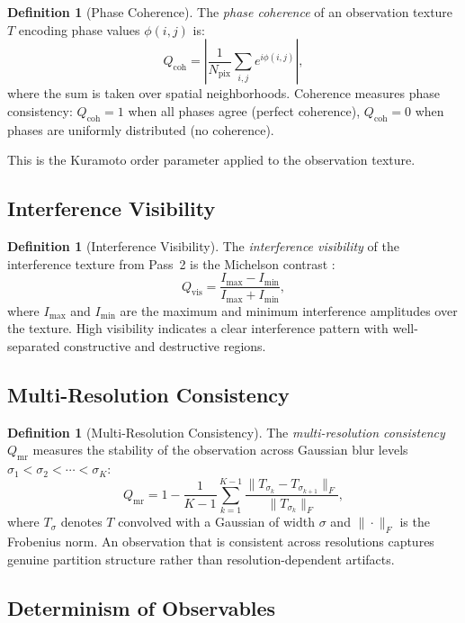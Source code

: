 \documentclass[11pt,twocolumn,a4paper]{article}
\theoremstyle{definition}
\newtheorem{definition}[theorem]{Definition}
\theoremstyle{remark}
\newcommand{\Qcoh}{Q_{\mathrm{coh}}}
\newcommand{\Qvis}{Q_{\mathrm{vis}}}
\newcommand{\Qmr}{Q_{\mathrm{mr}}}
\newcommand{\Npix}{N_{\mathrm{pix}}}
\begin{document}
\begin{definition}[Phase Coherence]
\label{def:coherence}
The \emph{phase coherence} of an observation texture $T$ encoding phase values $\phi(i,j)$ is:
\[
\Qcoh = \left| \frac{1}{\Npix} \sum_{i,j} e^{i\phi(i,j)} \right|,
\]
where the sum is taken over spatial neighborhoods. Coherence measures phase consistency: $\Qcoh = 1$ when all phases agree (perfect coherence), $\Qcoh = 0$ when phases are uniformly distributed (no coherence).
\end{definition}

This is the Kuramoto order parameter \citep{kuramoto1975, kuramoto1984} applied to the observation texture.

\subsection{Interference Visibility}

\begin{definition}[Interference Visibility]
\label{def:visibility}
The \emph{interference visibility} of the interference texture from Pass~2 is the Michelson contrast \citep{michelson1927}:
\[
\Qvis = \frac{I_{\max} - I_{\min}}{I_{\max} + I_{\min}},
\]
where $I_{\max}$ and $I_{\min}$ are the maximum and minimum interference amplitudes over the texture. High visibility indicates a clear interference pattern with well-separated constructive and destructive regions.
\end{definition}

\subsection{Multi-Resolution Consistency}

\begin{definition}[Multi-Resolution Consistency]
\label{def:multiresolution}
The \emph{multi-resolution consistency} $\Qmr$ measures the stability of the observation across Gaussian blur levels $\sigma_1 < \sigma_2 < \cdots < \sigma_K$:
\[
\Qmr = 1 - \frac{1}{K-1} \sum_{k=1}^{K-1} \frac{\|T_{\sigma_k} - T_{\sigma_{k+1}}\|_F}{\|T_{\sigma_k}\|_F},
\]
where $T_{\sigma}$ denotes $T$ convolved with a Gaussian of width $\sigma$ and $\|\cdot\|_F$ is the Frobenius norm. An observation that is consistent across resolutions captures genuine partition structure rather than resolution-dependent artifacts.
\end{definition}

\subsection{Determinism of Observables}
\end{document}
